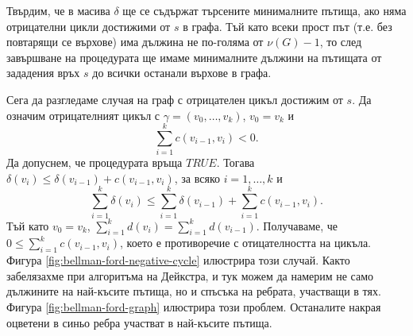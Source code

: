 Твърдим, че в масива $\delta$ ще се съдържат търсените минималните пътища, ако няма отрицателни цикли достижими от $s$ в графа.
Тъй като всеки прост път (т.е. без повтарящи се върхове) има дължина не по-голяма от $\nu(G) - 1$, то след завършване на процедурата ще имаме минималните 
дължини на пътищата от зададения връх $s$ до всички останали върхове в графа.

Сега да разгледаме случая на граф с отрицателен цикъл достижим от $s$.
Да означим отрицателният цикъл с $\gamma = (v_0,\dots,v_k)$, $v_0 = v_k$ и
\[\sum^{k}_{i=1}c(v_{i-1},v_i) < 0.\]
Да допуснем, че процедурата връща $TRUE$. Тогава $\delta(v_i) \leq \delta(v_{i-1}) + c(v_{i-1},v_i)$, за всяко $i=1,\dots,k$ и
\[\sum^{k}_{i=1} \delta(v_i) \leq \sum^{k}_{i=1}\delta(v_{i-1}) + \sum^{k}_{i=1}c(v_{i-1},v_i).\]
Тъй като $v_0 = v_k$, $\sum^{k}_{i=1} d(v_i) = \sum^{k}_{i=1}d(v_{i-1})$.
Получаваме, че $0 \leq \sum^{k}_{i=1}c(v_{i-1},v_i)$, което е противоречие с отицателността на цикъла.
Фигура \ref{fig:bellman-ford-negative-cycle} илюстрира този случай.
Както забелязахме при алгоритъма на Дейкстра, и тук можем да намерим не само дължините на най-късите пътища, но
и спъсъка на ребрата, участващи в тях. Фигура \ref{fig:bellman-ford-graph} илюстрира този проблем. 
Останалите накрая оцветени в синьо ребра участват в най-късите пътища.



